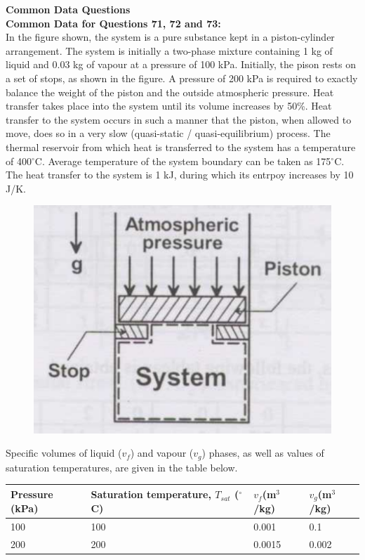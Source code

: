 \documentclass[journal,12pt,onecolumn]{IEEEtran}
\begin{document}
\noindent\large\textbf{Common Data Questions}\\
\noindent\normalsize\textbf{Common Data for Questions 71, 72 and 73:}\\
In the figure shown, the system is a pure substance kept in a piston-cylinder arrangement. The system is initially a two-phase mixture containing 1 kg of liquid and 0.03 kg of vapour at a pressure of 100 kPa. Initially, the pison rests on a set of stops, as shown in the figure. A pressure of 200 kPa is required to exactly balance the weight of the piston and the outside atmospheric pressure. Heat transfer takes place into the system until its volume increases by 50\%. Heat transfer to the system occurs in such a manner that the piston, when allowed to move, does so in a very slow (quasi-static / quasi-equilibrium) process. The thermal reservoir from which heat is transferred to the system has a temperature of 400$^\circ$C. Average temperature of the system boundary can be taken as 175$^\circ$C. The heat transfer to the system is 1 kJ, during which its entrpoy increases by 10 J/K.

\begin{figure}[H]
    \centering
    \includegraphics[scale=0.3]{q71}
    \caption{}
    \label{q71}
\end{figure}
Specific volumes of liquid ($v_f$) and vapour ($v_g$) phases, as well as values of saturation temperatures, are given in the table below.
\begin{table}[H]
    \centering\large
    \begin{tabular}{|l|l|l|l|}
        \hline
        Pressure (kPa) & Saturation temperature, $T_{sat}$ ($^\circ$C) & $v_f$(m$^3$/kg) & $v_g$(m$^3$/kg) \\\hline
        100            & 100                                           & 0.001           & 0.1             \\\hline
        200            & 200                                           & 0.0015          & 0.002           \\\hline
    \end{tabular}
    \label{t71}
\end{table}
\end{document}
